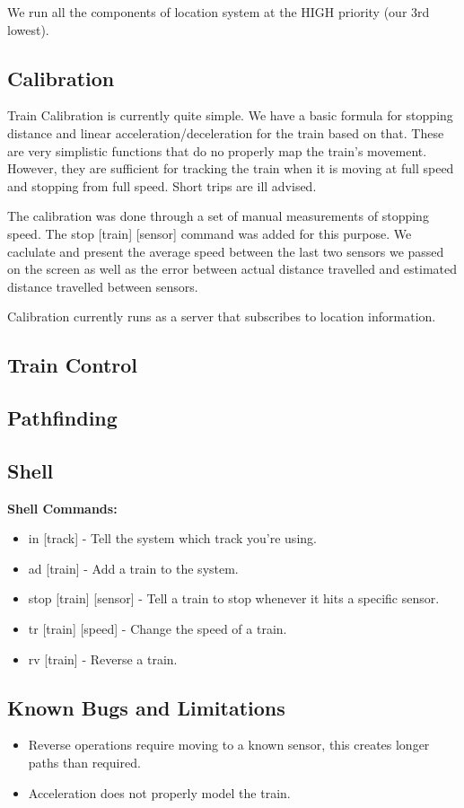 \documentclass{article}
\begin{document}
We run all the components of location system at the HIGH priority (our 3rd lowest).

\subsection{Calibration}

Train Calibration is currently quite simple. We have a basic formula for stopping distance and linear acceleration/deceleration for the train based on that. These are very simplistic functions that do no properly map the train's movement. However, they are sufficient for tracking the train when it is moving at full speed and stopping from full speed. Short trips are ill advised.

The calibration was done through a set of manual measurements of stopping speed. The stop [train] [sensor] command was added for this purpose.  We caclulate and present the average speed between the last two sensors we passed on the screen as well as the error between actual distance travelled and estimated distance travelled between sensors.

Calibration currently runs as a server that subscribes to location information.

\subsection{Train Control}

\subsection{Pathfinding}

\subsection{Shell}

\textbf{Shell Commands:}
\begin{itemize}
    \item in [track] - Tell the system which track you're using.
    \item ad [train] - Add a train to the system.
    \item stop [train] [sensor] - Tell a train to stop whenever it hits a specific sensor.
    \item tr [train] [speed] - Change the speed of a train.
    \item rv [train] - Reverse a train.
\end{itemize}

\subsection{Known Bugs and Limitations}
\begin{itemize}
\item Reverse operations require moving to a known sensor, this creates longer paths than required.
\item Acceleration does not properly model the train.
\end{itemize}
\end{document}
